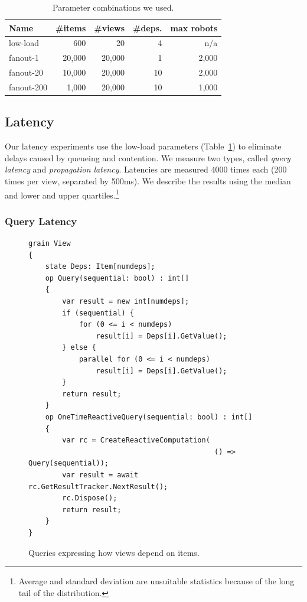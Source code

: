 \begin{table}
\begin{tabularx}{.99\columnwidth}{@{}Xrrrr@{}} \toprule
Name		& \#items 	& \#views & \#deps. & max robots\\ \midrule
low-load	&  600        	& 20       & 4 & n/a \\
fanout-1	& 20,000	& 20,000 & 1& 2,000 \\
fanout-20	& 10,000	& 20,000 & 10 & 2,000\\
fanout-200 & 1,000	& 20,000 & 10& 1,000\\  
\end{tabularx}
\caption{Parameter combinations we used.}\label{tab:param}
\end{table}


\subsection{Latency}\label{sec:latency}

Our latency experiments use the low-load parameters (Table~\ref{tab:param}) to eliminate delays caused by queueing and contention. We measure two types, called \emph{query latency} and \emph{propagation latency}. Latencies are measured 4000 times each (200 times per view, separated by 500ms). We describe the results using the median and lower and upper quartiles.\footnote{Average and standard deviation are unsuitable statistics because of the long tail of the distribution.}

\subsubsection{Query Latency}

\begin{figure}
\begin{lstlisting}
grain View
{
	state Deps: Item[numdeps]; 
	op Query(sequential: bool) : int[]
	{	
		var result = new int[numdeps];
		if (sequential) {
			for (0 <= i < numdeps)
				result[i] = Deps[i].GetValue();
		} else {
			parallel for (0 <= i < numdeps)
				result[i] = Deps[i].GetValue();
		}
		return result;
	}
	op OneTimeReactiveQuery(sequential: bool) : int[]
	{
	 	var rc = CreateReactiveComputation(
	 										() => Query(sequential));
		var result = await rc.GetResultTracker.NextResult();
		rc.Dispose();
		return result;
	}
}
\end{lstlisting}
\caption{Queries expressing how views depend on items.}\label{fig:queries}
\end{figure}

